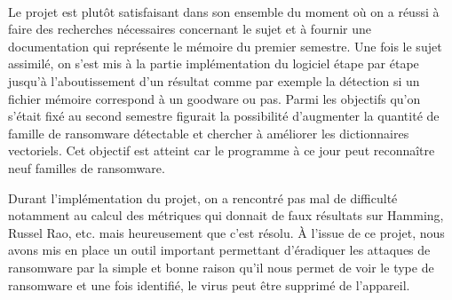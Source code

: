 \documentclass[a4paper, 12pt]{book}
\begin{document}
 \paragraph{}
Le projet est plutôt satisfaisant dans son ensemble du moment où on a réussi à faire des recherches nécessaires concernant le sujet et à fournir une documentation qui représente le mémoire du premier semestre.
\newline
Une fois le sujet assimilé, on s'est mis à la partie implémentation du logiciel étape par étape jusqu’à l'aboutissement d'un résultat comme par exemple la détection si un fichier mémoire correspond à un goodware ou pas.
\newline
Parmi les objectifs qu'on s’était fixé au second semestre figurait la possibilité d'augmenter la  quantité  de  famille de ransomware détectable  et chercher à améliorer les dictionnaires vectoriels. Cet objectif est atteint car le programme à ce jour peut reconnaître neuf familles de ransomware. 
\newline

Durant l'implémentation du projet, on a rencontré pas mal de difficulté notamment au calcul des métriques qui donnait de faux résultats sur Hamming, Russel Rao, etc. mais heureusement que c'est résolu.
\newline
\`{A} l'issue de ce projet, nous avons mis en place un outil important permettant d'éradiquer les attaques de ransomware par la simple et bonne raison qu'il nous permet de voir le type de ransomware et une fois identifié, le virus peut être supprimé de l'appareil.


\newpage
\end{document}
